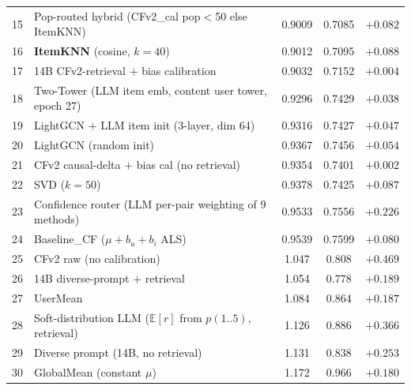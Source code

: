 \documentclass[11pt,a4paper]{article}
\begin{document}
\begin{table}[H]
\begin{tabular}{rlccc}
15 & Pop-routed hybrid (CFv2\_cal pop$<$50 else ItemKNN)                             & 0.9009        & 0.7085 & $+0.082$ \\
16 & \textbf{ItemKNN} (cosine, $k{=}40$)                                             & 0.9012        & 0.7095 & $+0.088$ \\
17 & 14B CFv2-retrieval $+$ bias calibration                                         & 0.9032        & 0.7152 & $+0.004$ \\
18 & Two-Tower (LLM item emb, content user tower, epoch 27)                         & 0.9296        & 0.7429 & $+0.038$ \\
19 & LightGCN $+$ LLM item init (3-layer, dim 64)                                   & 0.9316        & 0.7427 & $+0.047$ \\
20 & LightGCN (random init)                                                          & 0.9367        & 0.7456 & $+0.054$ \\
21 & CFv2 causal-delta $+$ bias cal (no retrieval)                                   & 0.9354        & 0.7401 & $+0.002$ \\
22 & SVD ($k{=}50$)                                                                   & 0.9378        & 0.7425 & $+0.087$ \\
23 & Confidence router (LLM per-pair weighting of 9 methods)                        & 0.9533        & 0.7556 & $+0.226$ \\
24 & Baseline\_CF ($\mu{+}b_u{+}b_i$ ALS)                                             & 0.9539        & 0.7599 & $+0.080$ \\
25 & CFv2 raw (no calibration)                                                       & 1.047         & 0.808  & $+0.469$ \\
26 & 14B diverse-prompt $+$ retrieval                                                & 1.054         & 0.778  & $+0.189$ \\
27 & UserMean                                                                         & 1.084         & 0.864  & $+0.187$ \\
28 & Soft-distribution LLM ($\mathbb{E}[r]$ from $p(1..5)$, retrieval)               & 1.126         & 0.886  & $+0.366$ \\
29 & Diverse prompt (14B, no retrieval)                                              & 1.131         & 0.838  & $+0.253$ \\
30 & GlobalMean (constant $\mu$)                                                     & 1.172         & 0.966  & $+0.180$ \\

\end{tabular}
\end{table}
\end{document}
